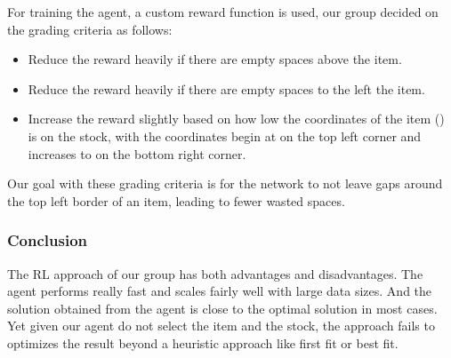 \documentclass[a4paper]{article}
\begin{document}
    \vspace{0.2cm}
    For training the agent, a custom reward function is used, our group decided on the grading criteria as follows:
    \begin{itemize}
        \item Reduce the reward heavily if there are empty spaces above the item.
        \item Reduce the reward heavily if there are empty spaces to the left the item.
        \item Increase the reward slightly based on how low the coordinates of the item (\boldmath{$[x, y]$}) is on the stock, with the coordinates begin at \boldmath{$[0, 0]$} on the top left corner and increases to \boldmath{$[W_s, H_s]$} on the bottom right corner. 
    \end{itemize}
    \vspace{0.2cm}
    Our goal with these grading criteria is for the network to not leave gaps around the top left border of an item, leading to fewer wasted spaces.
    \subsubsection{Conclusion}
    The RL approach of our group has both advantages and disadvantages. The agent performs really fast and scales fairly well with large data sizes. And the solution obtained from the agent is close to the optimal solution in most cases. Yet given our agent do not select the item and the stock, the approach fails to optimizes the result beyond a heuristic approach like first fit or best fit.
\end{document}
